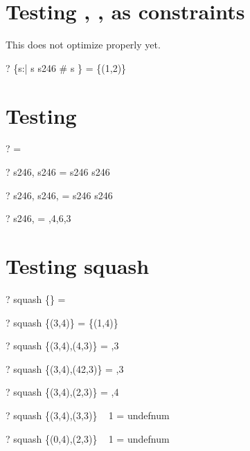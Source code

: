 \documentclass{article}
\begin{document}
\section{Testing \prefix, \suffix, \infix as constraints}
 This does not optimize properly yet.  
 \begin{zed} \vdash? \{s:\seq \nat | s \prefix s246 \land \# s \} = \power \{(1,2)\} \end{zed}

\section{Testing \dcat}
\begin{zed} \vdash? \dcat \langle \rangle = \langle \rangle \end{zed}
\begin{zed} \vdash? \dcat \langle s246, s246 \rangle = s246 \cat s246 \end{zed}
\begin{zed} \vdash? \dcat \langle s246, s246, \emptyset \rangle = s246 \cat s246 \end{zed}
\begin{zed} \vdash? \dcat \langle s246,  \rangle \rangle = ,4,6,3 \rangle \end{zed}

\section{Testing squash}
\begin{zed} \vdash? squash \{\} = \langle \rangle \end{zed}
\begin{zed} \vdash? squash \{(3,4)\} = \{(1,4)\} \end{zed}
\begin{zed} \vdash? squash \{(3,4),(4,3)\} = ,3 \rangle \end{zed}
\begin{zed} \vdash? squash \{(3,4),(42,3)\} = ,3 \rangle \end{zed}
\begin{zed} \vdash? squash \{(3,4),(2,3)\} = ,4 \rangle \end{zed}
\begin{zed} \vdash? squash \{(3,4),(3,3)\} ~ 1 = undefnum \end{zed}
\begin{zed} \vdash? squash \{(0,4),(2,3)\} ~ 1 = undefnum \end{zed}
\end{document}
